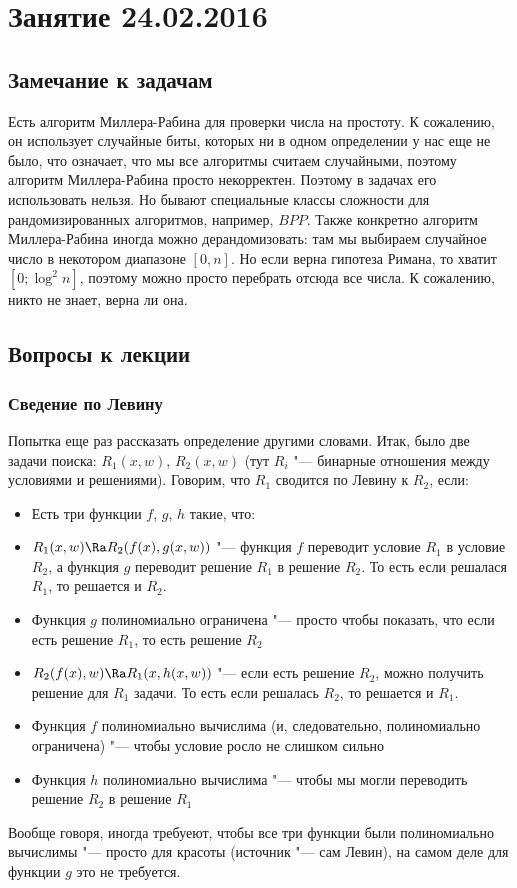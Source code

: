 \chapter{Занятие 24.02.2016}
\section{Замечание к задачам}
	Есть алгоритм Миллера-Рабина для проверки числа на простоту.
	К сожалению, он использует случайные биты, которых ни в одном определении у нас еще не было,
	что означает, что мы все алгоритмы считаем случайными, поэтому алгоритм Миллера-Рабина просто некорректен.
	Поэтому в задачах его использовать нельзя.
	Но бывают специальные классы сложности для рандомизированных алгоритмов, например, $BPP$.
	Также конкретно алгоритм Миллера-Рабина иногда можно дерандомизовать: там мы выбираем
	случайное число в некотором диапазоне $[0, n]$.
	Но если верна гипотеза Римана, то хватит $[0; \log^2 n]$, поэтому можно просто перебрать отсюда все числа.
	К сожалению, никто не знает, верна ли она.

\section{Вопросы к лекции}
\subsection{Сведение по Левину}
	Попытка еще раз рассказать определение другими словами.
	Итак, было две задачи поиска: $R_1(x, w)$, $R_2(x, w)$ (тут $R_i$ "--- бинарные отношения между условиями и решениями).
	Говорим, что $R_1$ сводится по Левину к $R_2$, если:
	\begin{itemize}
		\item Есть три функции $f$, $g$, $h$ такие, что:
		\item
			$R_1(x, w) \Ra R_2(f(x), g(x, w))$ "--- функция $f$ переводит условие $R_1$ в условие $R_2$,
			а функция $g$ переводит решение $R_1$ в решение $R_2$.
			То есть если решалася $R_1$, то решается и $R_2$.
		\item
			Функция $g$ полиномиально ограничена "--- просто чтобы показать, что если есть решение $R_1$, то есть решение $R_2$
		\item
			$R_2(f(x), w) \Ra R_1(x, h(x, w))$ "--- если есть решение $R_2$, можно
			получить решение для $R_1$ задачи.
			То есть если решалась $R_2$, то решается и $R_1$.
		\item
			Функция $f$ полиномиально вычислима (и, следовательно, полиномиально ограничена) "--- чтобы условие росло не слишком сильно
		\item
			Функция $h$ полиномиально вычислима "--- чтобы мы могли переводить решение $R_2$ в решение $R_1$
	\end{itemize}
	Вообще говоря, иногда требуеют, чтобы все три функции были полиномиально вычислимы "--- просто для красоты
	(источник "--- сам Левин), на самом деле для функции $g$ это не требуется.

